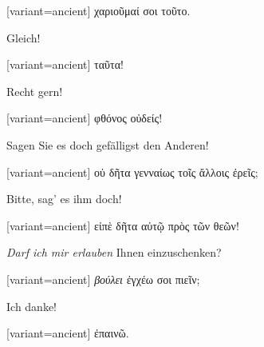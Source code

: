 \begin{greek}[variant=ancient]%
χαριοῦμαί σοι τοῦτο.

\end{greek}%
\switchcolumn*

Gleich!

\switchcolumn

\begin{greek}[variant=ancient]%
ταῦτα!

\end{greek}%
\switchcolumn*

Recht gern!

\switchcolumn

\begin{greek}[variant=ancient]%
φθόνος οὐδείς!

\end{greek}%
\switchcolumn*

Sagen Sie es doch gefälligst den Anderen!

\switchcolumn

\begin{greek}[variant=ancient]%
οὐ δῆτα γενναίως τοῖς ἄλλοις ἐρεῖς;

\end{greek}%
\switchcolumn*

Bitte, sag' es ihm doch!

\switchcolumn

\begin{greek}[variant=ancient]%
εἰπὲ δῆτα αὐτῷ πρὸς τῶν θεῶν!

\end{greek}%
\switchcolumn*

\emph{Darf ich mir erlauben} Ihnen einzuschenken?

\switchcolumn

\begin{greek}[variant=ancient]%
\emph{βούλει} ἐγχέω σοι πιεῖν;

\end{greek}%
\indent Ich danke!

\switchcolumn

\begin{greek}[variant=ancient]%
ἐπαινῶ.

\end{greek}%
\switchcolumn*

